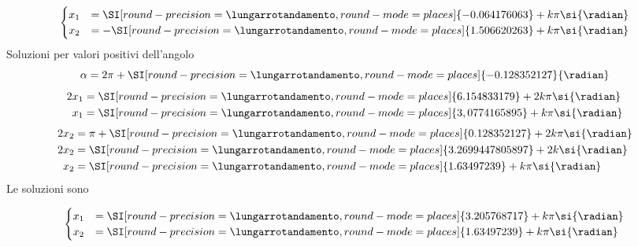  \[\begin{cases}
 x_1&=\SI[round-precision=\lungarrotandamento,round-mode=places]{-0.064176063}+k\pi \si{\radian}\\
 x_2&=-\SI[round-precision=\lungarrotandamento,round-mode=places]{1.506620263}+k\pi \si{\radian}\\
 \end{cases}\]
 Soluzioni per valori positivi dell'angolo
 \[\alpha=2\pi+ \SI[round-precision=\lungarrotandamento,round-mode=places]{-0.128352127}{\radian}\]
 \begin{align*}
 2x_1&=\SI[round-precision=\lungarrotandamento,round-mode=places]{6.154833179}+2k\pi \si{\radian}\\
 x_1&=\SI[round-precision=\lungarrotandamento,round-mode=places]{3,0774165895}+k\pi \si{\radian}\\
 \end{align*}
 \begin{align*}
 2x_2&=\pi+\SI[round-precision=\lungarrotandamento,round-mode=places]{0.128352127}+2k\pi \si{\radian}\\
 2x_2&=\SI[round-precision=\lungarrotandamento,round-mode=places]{3.2699447805897}+2k \si{\radian}\\
 x_2&=\SI[round-precision=\lungarrotandamento,round-mode=places]{1.63497239}+k\pi \si{\radian}\\
 \end{align*}
 Le soluzioni sono

 \[\begin{cases}
 x_1&=\SI[round-precision=\lungarrotandamento,round-mode=places]{3.205768717}+k\pi \si{\radian}\\
 x_2&=\SI[round-precision=\lungarrotandamento,round-mode=places]{1.63497239}+k\pi \si{\radian}\\
 \end{cases}\]

 
